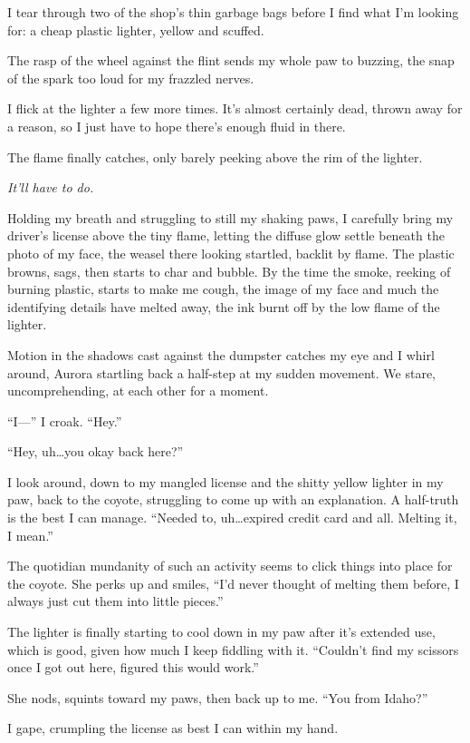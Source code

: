 I tear through two of the shop's thin garbage bags before I find what I'm looking for: a cheap plastic lighter, yellow and scuffed.

The rasp of the wheel against the flint sends my whole paw to buzzing, the snap of the spark too loud for my frazzled nerves.

I flick at the lighter a few more times. It's almost certainly dead, thrown away for a reason, so I just have to hope there's enough fluid in there.

The flame finally catches, only barely peeking above the rim of the lighter.

\emph{It'll have to do.}

Holding my breath and struggling to still my shaking paws, I carefully bring my driver's license above the tiny flame, letting the diffuse glow settle beneath the photo of my face, the weasel there looking startled, backlit by flame. The plastic browns, sags, then starts to char and bubble. By the time the smoke, reeking of burning plastic, starts to make me cough, the image of my face and much the identifying details have melted away, the ink burnt off by the low flame of the lighter.

Motion in the shadows cast against the dumpster catches my eye and I whirl around, Aurora startling back a half-step at my sudden movement. We stare, uncomprehending, at each other for a moment.

``I---'' I croak. ``Hey.''

``Hey, uh\ldots{}you okay back here?''

I look around, down to my mangled license and the shitty yellow lighter in my paw, back to the coyote, struggling to come up with an explanation. A half-truth is the best I can manage. ``Needed to, uh\ldots{}expired credit card and all. Melting it, I mean.''

The quotidian mundanity of such an activity seems to click things into place for the coyote. She perks up and smiles, ``I'd never thought of melting them before, I always just cut them into little pieces.''

The lighter is finally starting to cool down in my paw after it's extended use, which is good, given how much I keep fiddling with it. ``Couldn't find my scissors once I got out here, figured this would work.''

She nods, squints toward my paws, then back up to me. ``You from Idaho?''

I gape, crumpling the license as best I can within my hand.

